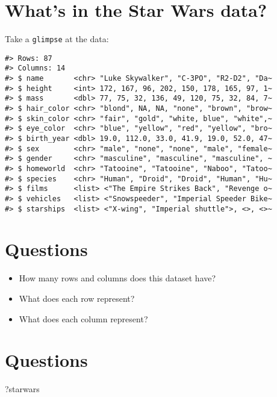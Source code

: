 \documentclass[
]{book}
\newenvironment{Shaded}{\begin{snugshade}}{\end{snugshade}}
\newcommand{\NormalTok}[1]{#1}
\providecommand{\tightlist}{%
  \setlength{\itemsep}{0pt}\setlength{\parskip}{0pt}}
\theoremstyle{definition}
\theoremstyle{definition}
\theoremstyle{definition}
\theoremstyle{definition}
\theoremstyle{remark}
\begin{document}
\hypertarget{whats-in-the-star-wars-data-1}{%
\section{What's in the Star Wars data?}\label{whats-in-the-star-wars-data-1}}

Take a \texttt{glimpse} at the data:

\begin{verbatim}
#> Rows: 87
#> Columns: 14
#> $ name       <chr> "Luke Skywalker", "C-3PO", "R2-D2", "Da~
#> $ height     <int> 172, 167, 96, 202, 150, 178, 165, 97, 1~
#> $ mass       <dbl> 77, 75, 32, 136, 49, 120, 75, 32, 84, 7~
#> $ hair_color <chr> "blond", NA, NA, "none", "brown", "brow~
#> $ skin_color <chr> "fair", "gold", "white, blue", "white",~
#> $ eye_color  <chr> "blue", "yellow", "red", "yellow", "bro~
#> $ birth_year <dbl> 19.0, 112.0, 33.0, 41.9, 19.0, 52.0, 47~
#> $ sex        <chr> "male", "none", "none", "male", "female~
#> $ gender     <chr> "masculine", "masculine", "masculine", ~
#> $ homeworld  <chr> "Tatooine", "Tatooine", "Naboo", "Tatoo~
#> $ species    <chr> "Human", "Droid", "Droid", "Human", "Hu~
#> $ films      <list> <"The Empire Strikes Back", "Revenge o~
#> $ vehicles   <list> <"Snowspeeder", "Imperial Speeder Bike~
#> $ starships  <list> <"X-wing", "Imperial shuttle">, <>, <>~
\end{verbatim}

\hypertarget{questions-3}{%
\section{Questions}\label{questions-3}}

\begin{itemize}
\tightlist
\item
  How many rows and columns does this dataset have?
\item
  What does each row represent?
\item
  What does each column represent?
\end{itemize}

\hypertarget{questions-4}{%
\section{Questions}\label{questions-4}}

\begin{Shaded}
\begin{Highlighting}[]
\NormalTok{?starwars}
\end{Highlighting}
\end{Shaded}
\end{document}
